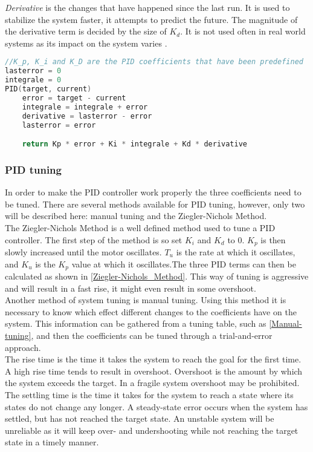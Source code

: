 \textit{Derivative} is the changes that have happened since the last run. It is used to stabilize the system faster, it attempts to predict the future. The magnitude of the derivative term is decided by the size of $K_d$. It is not used often in real world systems as its impact on the system varies \cite{PIDcontrolsystem}.

\begin{lstlisting}[language=C, label={pidpseudo1}, caption={Pseudo code of a PID}]
//K_p, K_i and K_D are the PID coefficients that have been predefined
lasterror = 0
integrale = 0
PID(target, current)
    error = target - current
    integrale = integrale + error
    derivative = lasterror - error
    lasterror = error

    return Kp * error + Ki * integrale + Kd * derivative
\end{lstlisting}


\subsubsection{PID tuning}
In order to make the PID controller work properly the three coefficients need to be tuned. There are several methods available for PID tuning, however, only two will be described here: manual tuning and the Ziegler-Nichols Method. \\

The Ziegler-Nichols Method is a well defined method used to tune a PID controller. The first step of the method is so set $K_i$ and $K_d$ to 0. $K_p$ is then slowly increased until the motor oscillates. $T_u$ is the rate at which it oscillates, and $K_u$ is the $K_p$ value at which it oscillates.The three PID terms can then be calculated as shown in \cref{Ziegler-Nichols_Method}. This way of tuning is aggressive and will result in a fast rise, it might even result in some overshoot. \\

Another method of system tuning is manual tuning. Using this method it is necessary to know which effect different changes to the coefficients have on the system. This information can be gathered from a tuning table, such as \cref{Manual-tuning}, and then the coefficients can be tuned through a trial-and-error approach. \\


The rise time is the time it takes the system to reach the goal for the first time. A high rise time tends to result in overshoot. Overshoot is the amount by which the system exceeds the target. In a fragile system overshoot may be prohibited. The settling time is the time it takes for the system to reach a state where its states do not change any longer. A steady-state error occurs when the system has settled, but has not reached the target state. An unstable system will be unreliable as it will keep over- and undershooting while not reaching the target state in a timely manner.


\medskip


